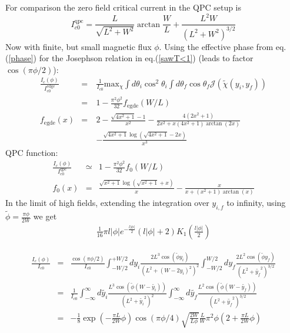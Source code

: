 \documentclass[a4paper]{article}
\begin{document}
For comparison the zero field critical current in the QPC setup is
	\begin{equation}
	I^{\text{qpc}}_{c0} =
	\frac{L}{\sqrt{L^2+W^2}}\arctan\frac{W}{L} + \frac{L^2W}{(L^2+W^2)^{3/2}}
	\label{Ic-0}
	\end{equation}	
Now with finite, but small magnetic flux $\phi$. Using the effective phase from eq. (\ref{phase}) for the Josephson relation in eq.(\ref{sawT<1}) (leads to factor $\cos(\pi \phi /2)$):
	\begin{eqnarray}
	\frac{I_c(\phi)}{I^{\text{edge}}_{c0}} &=& \frac{1}{I_{c0}} \text{max}_{\chi} \int d \theta_i \cos^2 \theta_i\int d \theta_f \cos \theta_f \mathcal{J}(\tilde{\chi}(y_i, y_f)) \\
	&=& 1 - \frac{\pi^2 \phi^2}{32}f_{\text{egde}}(W/L) \\
	f_{\text{egde}}(x) &=& 2 -\frac{\sqrt{4 x^2+1} -1}{x^2} - \frac{4 \left(2 x^2+1\right)}{2 x^2 + x\left(4 x^2+1\right) \arctan(2 x)} \\
	&\quad& - \frac{\sqrt{4 x^2+1} \log \left(\sqrt{4 x^2+1}-2 x\right)}{x^3}
	\end{eqnarray}
QPC function:
	\begin{eqnarray}
	\frac{I_c(\phi)}{I^{\text{qpc}}_{c0}}&\simeq& 1 - \frac{\pi ^2 \phi^2 }{32} f_0(W/L) \\
	f_0(x) &=& \frac{\sqrt{x^2+1} \log \left(\sqrt{x^2+1}+x\right)}{x}- \frac{x}{x+\left(x^2+1\right) \arctan(x)} 
	\end{eqnarray}
In the limit of high fields, extending the integration over $y_{i,f}$ to infinity, using $ \tilde{\phi} = \frac{\pi \phi}{2 W} $ we get
\begin{eqnarray}
\frac{1}{16} \pi  l \left| \phi \right|  e^{-\frac{l \left| \phi \right| }{2}} (l \left| \phi \right| +2) K_1\left(\frac{l \left| \phi \right| }{2}\right)
\end{eqnarray}


	\begin{eqnarray}
	\frac{I_c(\phi)}{I_{c0}}  &=& \frac{\cos (\pi \phi / 2)}{I_{c0}}\int_{-W/2}^{+W/2} d y_i \frac{ 2L^3  \cos (\tilde{\phi} y_i )}{\left(L^2 + (W - 2y_i)^2\right)^2 }\int_{-W/2}^{W/2} d y_f \frac{2L^2 \cos (\tilde{\phi} y_f ) }{\left(L^2 + \tilde{y_f}^2 \right)^{3/2}} \\
	&=& \frac{1}{I_{c0}}\int_{-\infty}^{\infty} d \tilde{y_i} \frac{ L^3  \cos \left(\tilde{\phi}(W - \tilde{y_i}) \right)}{\left(L^2 + \tilde{y_i}^2\right)^2 }\int_{-\infty}^{\infty} d \tilde{y_f} \frac{L^2 \cos \left(\tilde{\phi} (W - \tilde{y_f}) \right) }{\left(L^2 + \tilde{y_f}^2 \right)^{3/2}} \\
	&=& - \frac{1}{8}\exp(-\frac{\pi L}{2 W}\phi) \cos(\pi \phi /4) \sqrt{\frac{2W}{L\phi}} \frac{L}{W} \pi^2 \phi (2 + \frac{\pi L}{2 W} \phi)
	\end{eqnarray}
\end{document}
